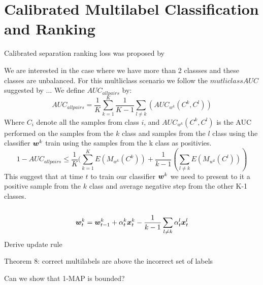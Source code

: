 \section{Calibrated Multilabel Classification and Ranking}

Calibrated separation ranking loss was proposed by \cite{GuoShuurmans11}

We are interested in the case where we have more than 2 classses and these classes are unbalanced. For this multliclass scenario we follow the $mutliclass AUC$ suggested by ... 
We define $AUC_{all pairs}$ by:
\[
	AUC_{all pairs} = \frac{1}{K} \sum\limits_{k=1}^{K}  \frac{1}{K-1}\sum\limits_{l \neq k} (AUC_{w^k}(C^k, C^l)) 
\]
Where $C_i$ denote all the samples from class $i$, and $AUC_{w^k}(C^k, C^l)$ is the AUC performed on the samples from the $k$ class and samples from the $l$ class using the classifier $ \bm{w}^k $ train using the samples from the k class as positivies.
\[
1 - AUC_{all pairs} \leq \frac{1}{K} ( \sum\limits_{k=1}^{K} E(M_{w^k}(C^k)) + \frac{1}{k-1} ( \sum\limits_{l \neq k}  E(M_{w^k}(C^l)) )
\]
This suggest that at time $t$ to train our classifier $\bm{w}^k $ we need to present to it a positive sample from the $k$ class and average negative step from the other K-1 classes.\\
\\
\[
  \bm{w}^k_t = \bm{w}^k_{t-1} + \alpha^k_t \bm{x}^k_t - \frac{1}{k-1}\sum\limits_{l \neq k} \alpha^l_t \bm{x}^l_t
\]
Derive update rule

Theorem 8: correct multilabels are above the incorrect set of labels

Can we show that 1-MAP is bounded?
